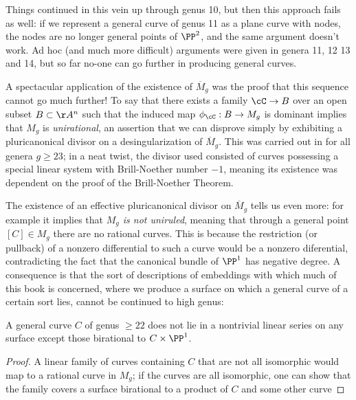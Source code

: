 Things continued in this vein up through genus 10, but then this approach fails as well: if we represent a general curve of genus 11 as a plane curve with nodes, the nodes are no longer general points of $\PP^2$, and the same argument doesn't work. Ad hoc (and much more difficult) arguments were given in genera 11, 12 13 and 14, but so far no-one can go further in producing general curves. 

A spectacular application of the existence of $\overline M_g$ was the proof that this sequence cannot go much further! To say that there exists a family $\cC \to B$ over an open subset $B \subset \AA^n$ such that the induced map $\phi_\cC : B \to M_g$ is dominant implies that $M_g$ is \emph{unirational}, an assertion that we can disprove simply by exhibiting a pluricanonical divisor on a desingularization of $\overline M_g$. This was carried out in  for all genera $g \geq 23$; in a neat twist, the divisor used consisted of curves possessing a special linear system with Brill-Noether number $-1$, meaning its existence was dependent on the proof of the Brill-Noether Theorem.

The existence of an effective pluricanonical divisor on $\overline M_g$ tells us even more: for example it implies that \emph{$M_g$ is not uniruled}, meaning that through a general point $[C] \in M_g$ there are no rational curves. This is because the restriction (or pullback) of a nonzero differential to such a curve would be a nonzero diferential, contradicting the fact that the canonical bundle of $\PP^1$ has  negative degree. A consequence is that the sort of descriptions of embeddings with which much of this book is concerned, where we produce a surface on which a general curve of a certain sort lies, cannot be continued to high genus:

\begin{corollary}
 A general curve $C$ of  genus $\geq 22$ does not lie in a nontrivial linear series on any surface
 except those birational to $C\times \PP^1$.
\end{corollary}
\begin{proof}
 A linear family of curves containing $C$ that are not all isomorphic would map to a rational curve in $M_g$; if the curves are all isomorphic, one can show that the family
 covers a surface birational to a product of $C$ and some other curve 
\end{proof}



